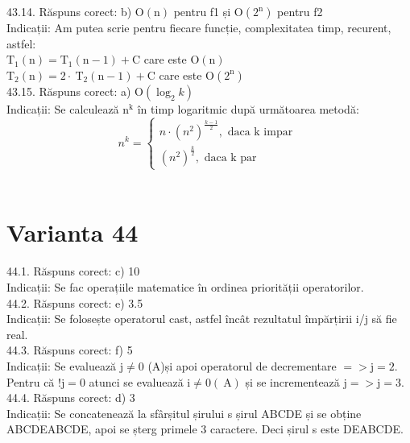 43.14. Răspuns corect: b) $\mathrm{O}(\mathrm{n})$ pentru f1 și $\mathrm{O}\left(2^{\mathrm{n}}\right)$ pentru f2\\
Indicații: Am putea scrie pentru fiecare funcție, complexitatea timp, recurent, astfel:\\
$\mathrm{T}_{1}(\mathrm{n})=\mathrm{T}_{1}(\mathrm{n}-1)+\mathrm{C}$ care este $\mathrm{O}(\mathrm{n})$\\
$\mathrm{T}_{2}(\mathrm{n})=2 \cdot \mathrm{~T}_{2}(\mathrm{n}-1)+\mathrm{C}$ care este $\mathrm{O}\left(2^{\mathrm{n}}\right)$\\

43.15. Răspuns corect: a) $\mathrm{O}\left(\log _{2} k\right)$\\
Indicații: Se calculează $\mathrm{n}^{\mathrm{k}}$ în timp logaritmic după următoarea metodă:\\
$$
n^{k}=\left\{\begin{array}{c}
n \cdot\left(n^{2}\right)^{\frac{k-1}{2}}, \text { daca\ k\ impar } \\
\left(n^{2}\right)^{\frac{k}{2}}, \text { daca\ k\ par }
\end{array}\right.
$$\\

\section*{Varianta 44}

44.1. Răspuns corect: c) 10\\
Indicații: Se fac operațiile matematice în ordinea priorității operatorilor.\\

44.2. Răspuns corect: e) 3.5\\
Indicații: Se folosește operatorul cast, astfel încât rezultatul împărțirii i/j să fie real.\\

44.3. Răspuns corect: f) 5\\
Indicații: Se evaluează $\mathrm{j} \neq 0$ (A)și apoi operatorul de decrementare $=>\mathrm{j}=2$. Pentru că $!\mathrm{j}=0$ atunci se evaluează $\mathrm{i} \neq 0(\mathrm{~A})$ și se incrementează $\mathrm{j}=>\mathrm{j}=3$.\\

44.4. Răspuns corect: d) 3\\
Indicații: Se concatenează la sfârșitul șirului s șirul ABCDE și se obține ABCDEABCDE, apoi se șterg primele 3 caractere. Deci șirul s este DEABCDE.\\

